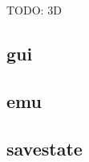 \documentclass[letterpaper,10pt,english]{sphinxmanual}
\begin{document}
\sphinxAtStartPar
TODO: 3D


\subsection{gui}
\label{\detokenize{mods:gui}}\label{\detokenize{mods:id2}}

\subsection{emu}
\label{\detokenize{mods:stylus}}\label{\detokenize{mods:id3}}

\subsection{savestate}
\label{\detokenize{mods:savestate}}\label{\detokenize{mods:id4}}
\end{document}
